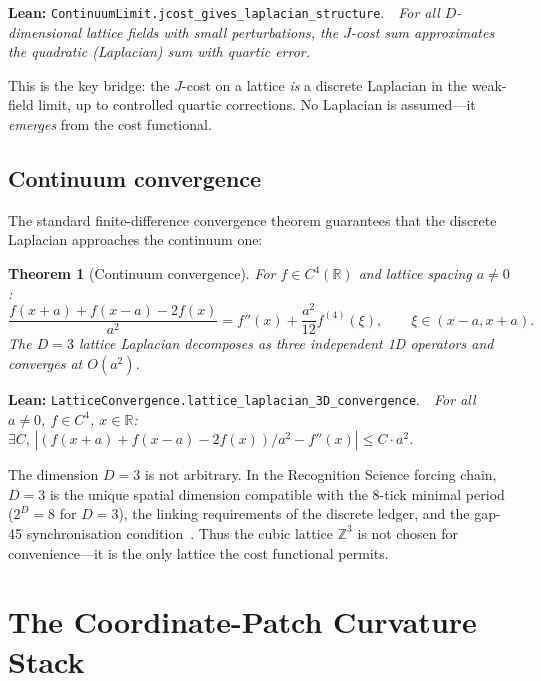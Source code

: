 \documentclass[11pt,a4paper]{article}
\newtheorem{theorem}{Theorem}[section]
\newcommand{\Jcost}{J}
\newcommand{\ZZ}{\mathbb{Z}}
\newcommand{\RR}{\mathbb{R}}
\newcommand{\lean}[1]{\texttt{#1}}
\newcommand{\leanref}[2]{\noindent\textbf{Lean:} \lean{#1}.\ \ \textit{#2}}
\begin{document}
\leanref{ContinuumLimit.jcost\_gives\_laplacian\_structure}{For all $D$-dimensional lattice fields with small perturbations, the $\Jcost$-cost sum approximates the quadratic (Laplacian) sum with quartic error.}

\noindent This is the key bridge: the $\Jcost$-cost on a lattice \emph{is} a discrete Laplacian in the weak-field limit, up to controlled quartic corrections.
No Laplacian is assumed---it \emph{emerges} from the cost functional.

\subsection{Continuum convergence}

The standard finite-difference convergence theorem guarantees that the discrete Laplacian approaches the continuum one:

\begin{theorem}[Continuum convergence]
\label{thm:convergence}
For $f \in C^4(\RR)$ and lattice spacing $a \ne 0$:
\begin{equation}\label{eq:convergence}
\frac{f(x+a) + f(x-a) - 2f(x)}{a^2} = f''(x) + \frac{a^2}{12}f^{(4)}(\xi), \qquad \xi \in (x-a, x+a).
\end{equation}
The $D{=}3$ lattice Laplacian decomposes as three independent 1D operators and converges at $O(a^2)$.
\end{theorem}

\leanref{LatticeConvergence.lattice\_laplacian\_3D\_convergence}{For all $a \ne 0$, $f \in C^4$, $x \in \RR$: $\exists C,\, |(f(x{+}a)+f(x{-}a)-2f(x))/a^2 - f''(x)| \le C \cdot a^2$.}

\noindent The dimension $D = 3$ is not arbitrary.
In the Recognition Science forcing chain, $D = 3$ is the unique spatial dimension compatible with the 8-tick minimal period ($2^D = 8$ for $D = 3$), the linking requirements of the discrete ledger, and the gap-45 synchronisation condition~\cite{WashburnZlatanovic2026}.
Thus the cubic lattice $\ZZ^3$ is not chosen for convenience---it is the only lattice the cost functional permits.

\section{The Coordinate-Patch Curvature Stack}
\label{sec:curvature}
\end{document}
